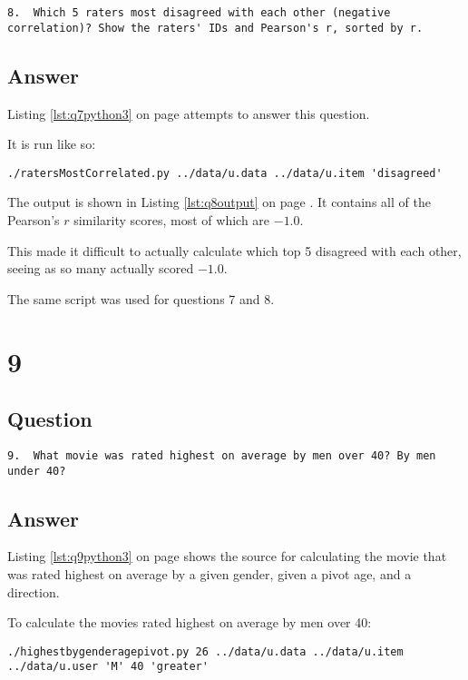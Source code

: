 \documentclass[letterpaper,11pt]{article}
\begin{document}
\begin{verbatim}
8.  Which 5 raters most disagreed with each other (negative
correlation)? Show the raters' IDs and Pearson's r, sorted by r.
\end{verbatim}

\subsection*{Answer}

Listing \ref{lst:q7python3} on page \pageref{lst:q7python3} attempts to answer this question.

It is run like so:
\begin{lstlisting}[frame=single]
./ratersMostCorrelated.py ../data/u.data ../data/u.item 'disagreed'
\end{lstlisting}

The output is shown in Listing \ref{lst:q8output} on page \pageref{lst:q8output}.  It contains all of the Pearson's $r$ similarity scores, most of which are $-1.0$.

This made it difficult to actually calculate which top 5 disagreed with each other, seeing as so many actually scored $-1.0$.

The same script was used for questions 7 and 8.

\newpage
\section*{9}

\subsection*{Question}

\begin{verbatim}
9.  What movie was rated highest on average by men over 40? By men
under 40?
\end{verbatim}

\subsection*{Answer}

Listing \ref{lst:q9python3} on page \pageref{lst:q9python3} shows the source for calculating the movie that was rated highest on average by a given gender, given a pivot age, and a direction.

To calculate the movies rated highest on average by men over 40:
\begin{lstlisting}[frame=single]
./highestbygenderagepivot.py 26 ../data/u.data ../data/u.item ../data/u.user 'M' 40 'greater'
\end{lstlisting}
\end{document}
